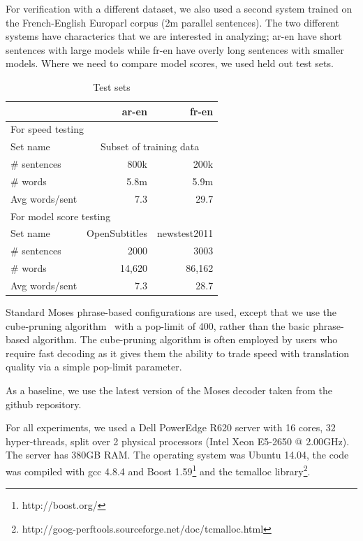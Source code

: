 \documentclass[11pt]{article}
\begin{document}
For verification with a different dataset, we also used a second system trained on the French-English Europarl corpus (2m parallel sentences). The two different systems have characterics that we are interested in analyzing; ar-en have short sentences with large models while fr-en have overly long sentences with smaller models. Where we need to compare model scores, we used held out test sets.

\begin{table}[h]
\begin{center}
\small
\begin{tabular}{|l|r|r|} \hline
		& ar-en		& fr-en \\ \hline
\multicolumn{3}{|l|}{For speed testing} \\ \hline
Set name	& \multicolumn{2}{|c|}{Subset of training data} \\
\# sentences  	& 800k 		& 200k \\
\# words 	& 5.8m 		& 5.9m \\ 
Avg words/sent	& 7.3		& 29.7 \\ \hline
\multicolumn{3}{|l|}{For model score testing} \\ \hline
Set name	& OpenSubtitles	& newstest2011 \\
\# sentences  	& 2000 		& 3003 \\
\# words 	& 14,620 	& 86,162 \\ 
Avg words/sent	& 7.3		& 28.7 \\ \hline
\end{tabular}
\end{center}
\caption{Test sets}
\label{tab:test-sets}
\end{table}

Standard Moses phrase-based configurations are used, except that we use the cube-pruning algorithm~\cite{Chiang:2007:cl} with a pop-limit of 400, rather than the basic phrase-based algorithm. The cube-pruning algorithm is often employed by users who require fast decoding as it gives them the ability to trade speed with translation quality via a simple pop-limit parameter.

As a baseline, we use the latest version of the Moses decoder taken from the github repository.

For all experiments, we used a Dell PowerEdge R620 server with 16 cores, 32 hyper-threads, split over 2 physical processors (Intel Xeon E5-2650 @ 2.00GHz). The server has 380GB RAM. The operating system was Ubuntu 14.04, the code was compiled with gcc 4.8.4 and Boost 1.59\footnote{http://boost.org/} and the tcmalloc library\footnote{http://goog-perftools.sourceforge.net/doc/tcmalloc.html}.
\end{document}
